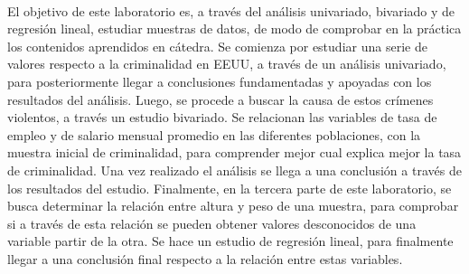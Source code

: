 \paragraph{}
El objetivo de este laboratorio es, a trav\'{e}s del an\'{a}lisis univariado, bivariado y de regresi\'{o}n lineal, estudiar muestras de datos, de modo de comprobar en la pr\'{a}ctica los contenidos aprendidos en c\'{a}tedra. Se comienza por estudiar una serie de valores respecto a la criminalidad en EEUU, a trav\'{e}s de un an\'{a}lisis univariado, para posteriormente llegar a conclusiones fundamentadas y apoyadas con los resultados del an\'{a}lisis. Luego, se procede a buscar la causa de estos cr\'{i}menes violentos, a trav\'{e}s un estudio bivariado. Se relacionan las variables de tasa de empleo y de salario mensual promedio en las diferentes poblaciones, con la muestra inicial de criminalidad, para comprender mejor cual explica mejor la tasa de criminalidad. Una vez realizado el an\'{a}lisis se llega a una conclusi\'{o}n a trav\'{e}s de los resultados del estudio. Finalmente, en la tercera parte de este laboratorio, se busca determinar la relaci\'{o}n entre altura y peso de una muestra, para comprobar si a trav\'{e}s de esta relaci\'{o}n se pueden obtener valores desconocidos de una variable  partir de la otra. Se hace un estudio de regresi\'{o}n lineal, para finalmente llegar a una conclusi\'{o}n final respecto a la relaci\'{o}n entre estas variables.